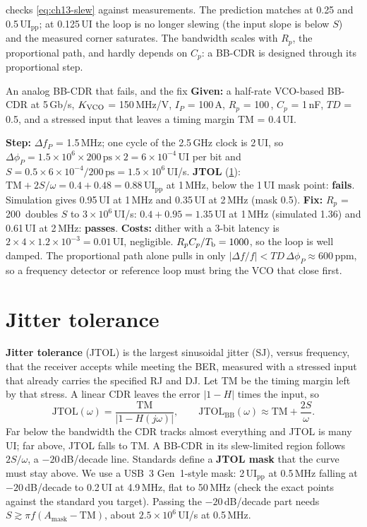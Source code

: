  checks \cref{eq:ch13-slew} against measurements. The prediction matches at 0.25 and 0.5\,UI$_\mathrm{pp}$; at 0.125\,UI the loop is no longer slewing (the input slope is below $S$) and the measured corner saturates. The bandwidth scales with $R_p$, the proportional path, and hardly depends on $C_p$: a BB-CDR is designed through its proportional step.

\begin{example}{An analog BB-CDR that fails, and the fix}\label{we:ch13-bb}
\textbf{Given:} a half-rate VCO-based BB-CDR at 5\,Gb/s, $K_\mathrm{VCO}$ = 150\,MHz/V, $I_P$ = 100\,\textmu{}A, $R_p$ = 100\,\Ohm, $C_p$ = 1\,nF, $TD$ = 0.5, and a stressed input that leaves a timing margin TM = 0.4\,UI.

\textbf{Step:} $\Delta f_P$ = 1.5\,MHz; one cycle of the 2.5\,GHz clock is 2\,UI, so $\Delta\phi_P = 1.5\times10^6\times200\,\mathrm{ps}\times2 = 6\times10^{-4}$\,UI per bit and $S = 0.5\times6\times10^{-4}/200\,\mathrm{ps} = 1.5\times10^6$\,UI/s.
\textbf{JTOL} (\cref{sec:jtol}): $\mathrm{TM} + 2S/\omega = 0.4 + 0.48 = 0.88$\,UI$_\mathrm{pp}$ at 1\,MHz, below the 1\,UI mask point: \textbf{fails}. Simulation gives 0.95\,UI at 1\,MHz and 0.35\,UI at 2\,MHz (mask 0.5).
\textbf{Fix:} $R_p$ = 200\,\Ohm{} doubles $S$ to $3\times10^6$\,UI/s: $0.4 + 0.95 = 1.35$\,UI at 1\,MHz (simulated 1.36) and 0.61\,UI at 2\,MHz: \textbf{passes}.
\textbf{Costs:} dither with a 3-bit latency is $2\times4\times1.2\times10^{-3} = 0.01$\,UI, negligible. $R_pC_p/T_\mathrm{b} = 1000$, so the loop is well damped. The proportional path alone pulls in only $|\Delta f/f| < TD\,\Delta\phi_P \approx 600$\,ppm, so a frequency detector or reference loop must bring the VCO that close first.
\end{example}

\section{Jitter tolerance}\label{sec:jtol}

\textbf{Jitter tolerance} (JTOL) is the largest sinusoidal jitter (SJ), versus frequency, that the receiver accepts while meeting the BER, measured with a stressed input that already carries the specified RJ and DJ. Let TM be the timing margin left by that stress. A linear CDR leaves the error $|1-H|$ times the input, so
\begin{equation}
  \mathrm{JTOL}(\omega) = \frac{\mathrm{TM}}{|1 - H(j\omega)|}, \qquad
  \mathrm{JTOL}_\mathrm{BB}(\omega) \approx \mathrm{TM} + \frac{2S}{\omega} .
  \label{eq:ch13-jtol}
\end{equation}
Far below the bandwidth the CDR tracks almost everything and JTOL is many UI; far above, JTOL falls to TM. A BB-CDR in its slew-limited region follows $2S/\omega$, a $-20$\,dB/decade line. Standards define a \textbf{JTOL mask} that the curve must stay above. We use a USB~3 Gen~1-style mask: 2\,UI$_\mathrm{pp}$ at 0.5\,MHz falling at $-20$\,dB/decade to 0.2\,UI at 4.9\,MHz, flat to 50\,MHz (check the exact points against the standard you target). Passing the $-20$\,dB/decade part needs $S \gtrsim \pi f(A_\mathrm{mask} - \mathrm{TM})$, about $2.5\times10^6$\,UI/s at 0.5\,MHz.

